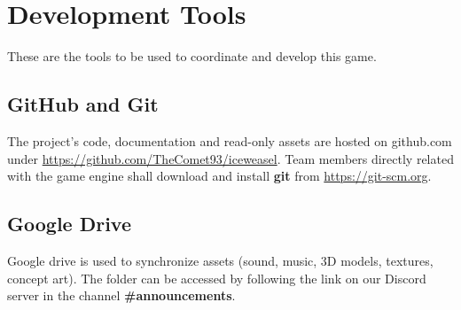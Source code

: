 \section{Development Tools}

These are the tools to be used to coordinate and develop this game.


\subsection{GitHub and Git}

The project's code, documentation  and read-only assets are hosted on github.com
under  \url{https://github.com/TheComet93/iceweasel}.   Team   members  directly
related  with  the  game  engine  shall  download and install \textbf{git}  from
\url{https://git-scm.org}.


\subsection{Google Drive}

Google drive is used to synchronize assets (sound, music, 3D  models,  textures,
concept  art). The folder can be accessed by following the link on  our  Discord
server in the channel \textbf{\#announcements}.

